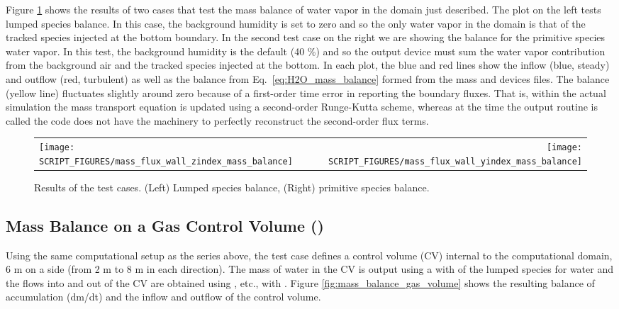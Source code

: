 \documentclass[11pt]{book}
\begin{document}
Figure \ref{fig:H2O_mass_balance} shows the results of two cases that test the mass balance of water vapor in the domain just described.  The plot on the left tests lumped species balance.  In this case, the background humidity is set to zero and so the only water vapor in the domain is that of the tracked species injected at the bottom boundary.  In the second test case on the right we are showing the balance for the primitive species water vapor.  In this test, the background humidity is the default (40 \%) and so the output device must sum the water vapor contribution from the background air and the tracked species injected at the bottom.  In each plot, the blue and red lines show the inflow (blue, steady) and outflow (red, turbulent) as well as the balance from Eq.~\ref{eq:H2O_mass_balance} formed from the mass and devices files.  The balance (yellow line) fluctuates slightly around zero because of a first-order time error in reporting the boundary fluxes.  That is, within the actual simulation the mass transport equation is updated using a second-order Runge-Kutta scheme, whereas at the time the output routine is called the code does not have the machinery to perfectly reconstruct the second-order flux terms.

\begin{figure}[ht]
\begin{tabular*}{\textwidth}{lr}
\texttt{[image: SCRIPT\_FIGURES/mass\_flux\_wall\_zindex\_mass\_balance]} &
\texttt{[image: SCRIPT\_FIGURES/mass\_flux\_wall\_yindex\_mass\_balance]}
\end{tabular*}
\caption[The  test cases]{Results of the  test cases.  (Left) Lumped species balance, (Right) primitive species balance.}
\label{fig:H2O_mass_balance}
\end{figure}

\subsection{Mass Balance on a Gas Control Volume (\texorpdfstring{}{mass\_balance\_gas\_volume})}
\label{mass_balance_gas_volume}

Using the same computational setup as the  series above, the  test case defines a control volume (CV) internal to the computational domain, 6 m on a side (from 2 m to 8 m in each direction).  The mass of water in the CV is output using a  with  of the lumped species for water and the flows into and out of the CV are obtained using , etc., with . Figure \ref{fig:mass_balance_gas_volume} shows the resulting balance of accumulation (dm/dt) and the inflow and outflow of the control volume.
\end{document}
